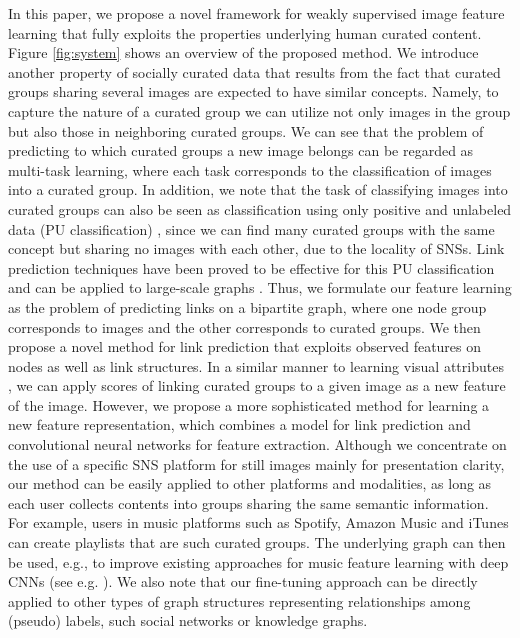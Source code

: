 \documentclass[letterpaper]{article} %
\begin{document}
In this paper, we propose a novel framework for weakly supervised image feature learning that fully exploits the properties underlying human curated content.
Figure \ref{fig:system} shows an overview of the proposed method.
We introduce another property of socially curated data that results from the fact that curated groups sharing several images are expected to have similar concepts.
Namely, to capture the nature of a curated group we can utilize not only images in the group but also those in neighboring curated groups.
We can see that the problem of predicting to which curated groups a new image belongs can be regarded as multi-task learning, where each task corresponds to the classification of images into a curated group.
In addition, we note that the task of classifying images into curated groups can also be seen as classification using only positive and unlabeled data (PU classification) \cite{dePlessis2015}, since we can find many curated groups with the same concept but sharing no images with each other, due to the locality of SNSs.
Link prediction techniques have been proved to be effective for this PU classification \cite{Chang2016} and can be applied to large-scale graphs \cite{Menon2011}.
Thus, we formulate our feature learning as the problem of predicting links on a bipartite graph, where one node group corresponds to images and the other corresponds to curated groups.
We then propose a novel method for link prediction that exploits observed features on nodes as well as link structures.
In a similar manner to learning visual attributes \cite{Farhadi2009}, we can apply scores of linking curated groups to a given image as a new feature of the image.
However, we propose a more sophisticated method for learning a new feature representation, which combines a model for link prediction and convolutional neural networks for feature extraction.
Although we concentrate on the use of a specific SNS platform for still images mainly for presentation clarity, our method can be easily applied to other platforms and modalities, as long as each user collects contents into groups sharing the same semantic information.
For example, users in music platforms such as Spotify, Amazon Music and iTunes can create playlists that are such curated groups.
The underlying graph can then be used, e.g., to improve existing approaches for music feature learning with deep CNNs (see e.g. \cite{Lee2009}).
We also note that our fine-tuning approach can be directly applied to other types of graph structures representing relationships among (pseudo) labels, such social networks or knowledge graphs.
\end{document}
